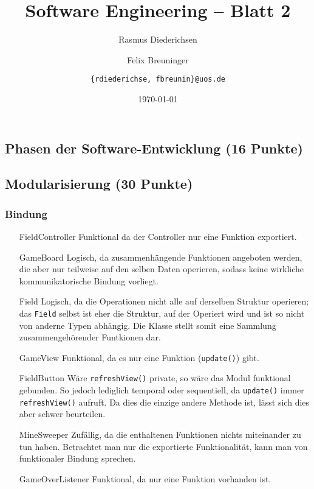 \documentclass{scrartcl}
\title{\rmfamily Software Engineering -- Blatt 2}
\author{Rasmus Diederichsen \and Felix Breuninger\and %
   \texttt{\{rdiederichse, fbreunin\}@uos.de}
}
\date{\today}
\begin{document}
\selectfont
\maketitle


\setcounter{section}{2}
\setcounter{subsection}{0}
\subsection{Phasen der Software-Entwicklung (16 Punkte)}
\subsection{Modularisierung (30 Punkte)}


\subsubsection{Bindung}

\begin{itemize}[font=\ttfamily,leftmargin=2cm,align=left]
   \item[FieldController] Funktional da der Controller nur eine Funktion
      exportiert.
   \item[GameBoard] Logisch, da zusammenhängende Funktionen angeboten werden,
      die aber nur teilweise auf den selben Daten operieren, sodass keine
      wirkliche kommunikatorische Bindung vorliegt.
   \item[Field] Logisch, da die Operationen nicht alle auf derselben Struktur
      operieren; das \texttt{Field} selbst ist eher die Struktur, auf der
      Operiert wird und ist so nicht von anderne Typen abhängig. Die Klasse
      stellt somit eine Sammlung zusammengehörender Funtkionen dar.
   \item[GameView] Funktional, da es nur eine Funktion (\texttt{update()}) gibt.
   \item[FieldButton] Wäre \texttt{refreshView()} private, so wäre das Modul
      funktional gebunden. So jedoch lediglich temporal oder sequentiell, da
      \texttt{update()} immer \texttt{refreshView()} aufruft. Da dies die
      einzige andere Methode ist, lässt sich dies aber schwer beurteilen.
   \item[MineSweeper] Zufällig, da die enthaltenen Funktionen nichts miteinander
      zu tun haben. Betrachtet man nur die exportierte Funktionalität, kann man
      von funktionaler Bindung sprechen.
   \item[GameOverListener] Funktional, da nur eine Funktion vorhanden ist.
\end{itemize}
\end{document}
